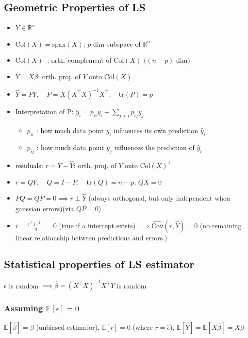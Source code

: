 \subsection*{Geometric Properties of LS}
\begin{itemize}
    \item $Y \in \mathbb{R}^n$
    \item $\text{Col}(X) = \text{span}(X)$: $p$-dim subspace of $\mathbb{R}^n$
    \item $\text{Col}(X)^\perp$: orth. complement of $\text{Col}(X)$ ($(n-p)$-dim)
    \item $\hat{Y} = X\hat{\beta}$: orth. proj. of $Y$ onto $\text{Col}(X)$
    \item $\hat{Y} = PY, \quad {P = X(X^\top X)^{-1}X^\top}, \quad \text{tr}(P)=p$
    \item Interpretation of P:
    $\hat{y}_i = p_{ii} y_i + \sum_{j \neq i} p_{ij} y_j$
    \begin{itemize}
        \item $p_{ii}$ : how much data point $y_i$ influences its own prediction $\hat{y}_i$
        \item $p_{ij}$ : how much data point $y_j$ influences the prediction of $\hat{y}_i$
    \end{itemize}
    
    
    \item residuals: $r = Y - \hat{Y}$: orth. proj. of $Y$ onto $\text{Col}(X)^\perp$
    \item $r = QY, \quad Q = I - P, \quad \text{tr}(Q)=n-p$, \quad $QX=0$
    \item $\underline{PQ = QP = 0} \implies r \perp \hat{Y}$ (always orthogonal, but only independent when gaussian errors)(via $QP=0$)
    \item $\bar{r} = \frac{r^\top x^{(1)}}{n} = 0$ (true if a intercept exists) $\implies \widehat{\text{Cov}}(r, \hat{Y}) = 0$ (no remaining linear relationship between predictions and errors.)
\end{itemize}

\subsection{Statistical properties of LS estimator}
$\epsilon$ is random $\implies \hat{\beta}=(X^\top X)^{-1}X^\top Y$ is random

\subsubsection*{Assuming $\mathbb{E}[\epsilon]=0$}
$\mathbb{E}[\hat{\beta}] = \beta$ (unbiased estimator), $\mathbb{E}[r] = 0$ \quad (where $r = \hat{\epsilon}$), $\mathbb{E}[\hat{Y}] = \mathbb{E}[X\hat{\beta}] = X\beta$

